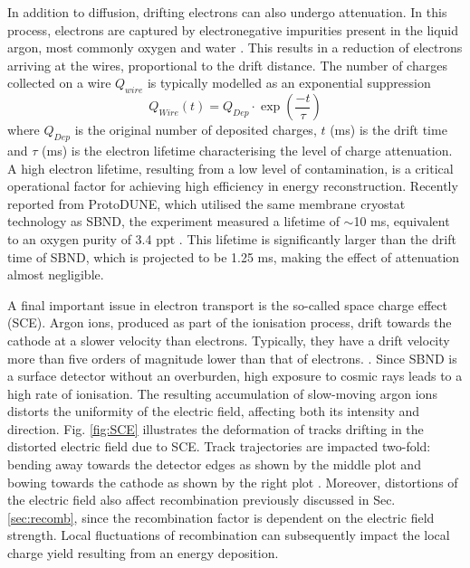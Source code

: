 In addition to diffusion, drifting electrons can also undergo attenuation.  
In this process, electrons are captured by electronegative impurities present in the liquid argon, most commonly oxygen and water \cite{protodune}.
This results in a reduction of electrons arriving at the wires, proportional to the drift distance. 
The number of charges collected on a wire $Q_{wire}$ is typically modelled as an exponential suppression
\begin{equation}
	Q_{Wire} (t) = Q_{Dep} \cdot \exp\left(\frac{-t}{\tau}\right)
\label{eq:etime}
\end{equation}
where $Q_{Dep}$ is the original number of deposited charges, $t$ (ms) is the drift time and $\tau$ (ms) is the electron lifetime characterising the level of charge attenuation.
A high electron lifetime, resulting from a low level of contamination, is a critical operational factor for achieving high efficiency in energy reconstruction.
Recently reported from ProtoDUNE, which utilised the same membrane cryostat technology as SBND, the experiment measured a lifetime of $\sim$10 ms, equivalent to an oxygen purity of 3.4 ppt \cite{protodune}.
This lifetime is significantly larger than the drift time of SBND, which is projected to be 1.25 ms, making the effect of attenuation almost negligible. 



A final important issue in electron transport is the so-called space charge effect (SCE).
Argon ions, produced as part of the ionisation process, drift towards the cathode at a slower velocity than electrons.
Typically, they have a drift velocity more than five orders of magnitude lower than that of electrons. \cite{icarus_sce}.
Since SBND is a surface detector without an overburden, high exposure to cosmic rays leads to a high rate of ionisation.
The resulting accumulation of slow-moving argon ions distorts the uniformity of the electric field, affecting both its intensity and direction.
Fig. \ref{fig:SCE} illustrates the deformation of tracks drifting in the distorted electric field due to SCE.
Track trajectories are impacted two-fold: bending away towards the detector edges as shown by the middle plot and bowing towards the cathode as shown by the right plot \cite{SCE}.
Moreover, distortions of the electric field also affect recombination previously discussed in Sec. \ref{sec:recomb}, since the recombination factor is dependent on the electric field strength.
Local fluctuations of recombination can subsequently impact the local charge yield resulting from an energy deposition.


